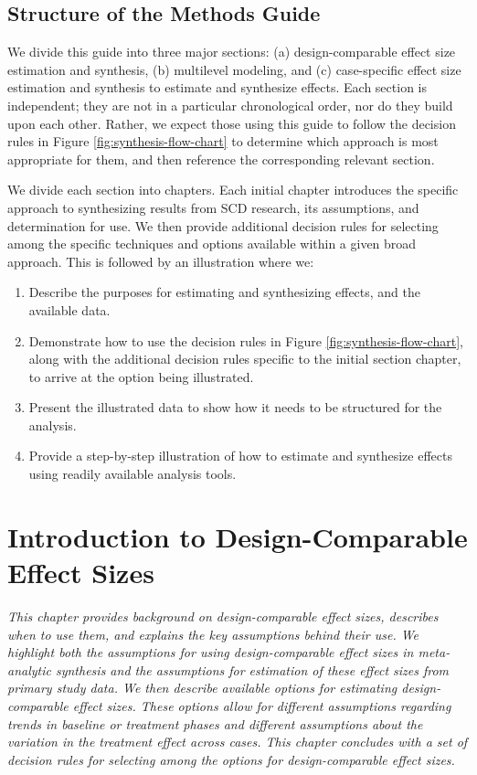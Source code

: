 \documentclass[
]{book}
\begin{document}
\hypertarget{structure-of-the-methods-guide}{%
\section{Structure of the Methods Guide}\label{structure-of-the-methods-guide}}

We divide this guide into three major sections:
(a) design-comparable effect size estimation and synthesis,
(b) multilevel modeling, and
(c) case-specific effect size estimation and synthesis to estimate and synthesize effects.
Each section is independent; they are not in a particular chronological order, nor do they build upon each other.
Rather, we expect those using this guide to follow the decision rules in Figure \ref{fig:synthesis-flow-chart} to determine which approach is most appropriate for them, and then reference the corresponding relevant section.

We divide each section into chapters.
Each initial chapter introduces the specific approach to synthesizing results from SCD research, its assumptions, and determination for use.
We then provide additional decision rules for selecting among the specific techniques and options available within a given broad approach.
This is followed by an illustration where we:

\begin{enumerate}
\def\labelenumi{\arabic{enumi}.}
\item
  Describe the purposes for estimating and synthesizing effects, and the available data.
\item
  Demonstrate how to use the decision rules in Figure \ref{fig:synthesis-flow-chart}, along with the additional decision rules specific to the initial section chapter, to arrive at the option being illustrated.
\item
  Present the illustrated data to show how it needs to be structured for the analysis.
\item
  Provide a step-by-step illustration of how to estimate and synthesize effects using readily available analysis tools.
\end{enumerate}

\hypertarget{D-CES}{%
\chapter{Introduction to Design-Comparable Effect Sizes}\label{D-CES}}

\emph{This chapter provides background on design-comparable effect sizes, describes when to use them, and explains the key assumptions behind their use.
We highlight both the assumptions for using design-comparable effect sizes in meta-analytic synthesis and the assumptions for estimation of these effect sizes from primary study data.
We then describe available options for estimating design-comparable effect sizes.
These options allow for different assumptions regarding trends in baseline or treatment phases and different assumptions about the variation in the treatment effect across cases.
This chapter concludes with a set of decision rules for selecting among the options for design-comparable effect sizes.}
\end{document}
